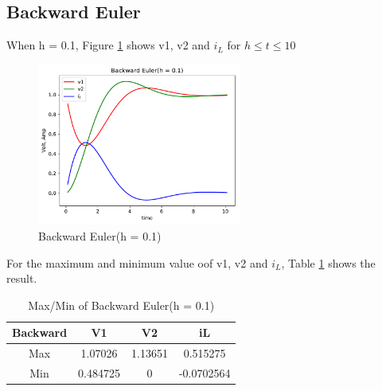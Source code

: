 \documentclass{article}
\begin{document}
\subsection{Backward Euler}
When h = 0.1, Figure \ref{fig:back 01} shows v1, v2 and $i_L$ for $h \leq t \leq 10$
\begin{figure}[H]
    \centering
    \includegraphics[width=0.6\textwidth]{src/back_01.pdf}
    \caption{Backward Euler(h = 0.1)}
    \label{fig:back 01}
\end{figure}
For the maximum and minimum value oof v1, v2 and $i_L$, Table \ref{tab:back 01} shows the result.
\begin{table}[htbp]
    \begin{center}
        \begin{tabular}{|c|c|c|c|}
            \hline
            Backward & V1 & V2 & iL \\ \hline
            Max & 1.07026 & 1.13651 & 0.515275 \\ \hline
            Min & 0.484725 & 0 & -0.0702564 \\ \hline
        \end{tabular}
    \end{center}
    \caption{Max/Min of Backward Euler(h = 0.1)}
    \label{tab:back 01}
\end{table}
\end{document}

